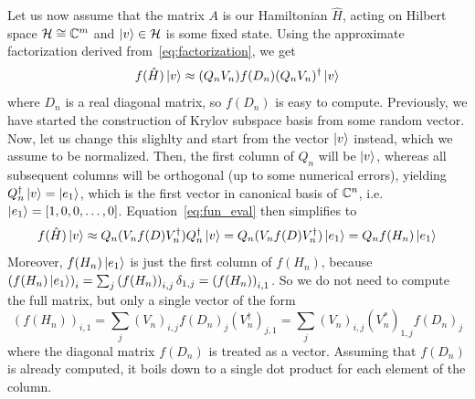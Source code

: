 Let us now assume that the matrix \(A\) is our Hamiltonian \(\hat{H}\), acting on Hilbert space \(\mathcal{H}\cong \mathbb{C}^m\)
and \(\ket{v}\in \mathcal{H}\) is some fixed state.
Using the approximate factorization derived from~\eqref{eq:factorization}, we get
\begin{equation}
	f(\hat{H})\ket{v} \approx (Q_n V_n) f(D_n) (Q_n V_n)^{\dagger} \ket{v} 
	\label{eq:fun_eval}
\end{equation}
where \(D_n\) is a real diagonal matrix, so \(f(D_n)\) is easy to compute.
Previously, we have started the construction of Krylov subspace basis from some random vector. Now, let us
change this slighlty and start from the vector \(\ket{v}\) instead, which we assume to be normalized. Then,
the first column of \(Q_n\) will be \(\ket{v}\), whereas all subsequent columns will be orthogonal (up to some
numerical errors), yielding \(Q_n^{\dagger}\ket{v} = \ket{e_1}\), which is the first vector in canonical basis
of \( \mathbb{C}^n \), i.e. \( \ket{e_1} = \left[1,0,0,\ldots,0\right] \). Equation~\eqref{eq:fun_eval} then
simplifies to
\begin{equation}
	f(\hat{H}) \ket{v} \approx Q_n (V_n f(D) V_n^{\dagger}) Q_n^{\dagger} \ket{v} = Q_n (V_n f(D) V_n^{\dagger}) \ket{e_1}
	= Q_n f(H_n) \ket{e_1} 
	\label{eq:lanczos_function}
\end{equation}
Moreover, \(f(H_n) \ket{e_1}\) is just the first column of \(f(H_n)\), because \( \left(f(H_n) \ket{e_1}\right)_i =
\sum_j \left(f(H_n)\right)_{i,j} \delta_{1,j} = \left(f(H_n)\right)_{i,1}\). So we do not need to compute the full
matrix, but only a single vector of the form
\begin{equation}
	\left(f(H_n)\right)_{i,1} = \sum_j \left(V_n\right)_{i,j} f(D_n)_j \left(V_n^{\dagger}\right)_{j,1}
	=  \sum_j \left(V_n\right)_{i,j} \left(V_n^{\ast}\right)_{1,j} f(D_n)_j
	\label{eq:c_vector}
\end{equation}
where the diagonal matrix \(f(D_n)\) is treated as a vector. Assuming that \(f(D_n)\) is already computed, it boils
down to a single dot product for each element of the column.

